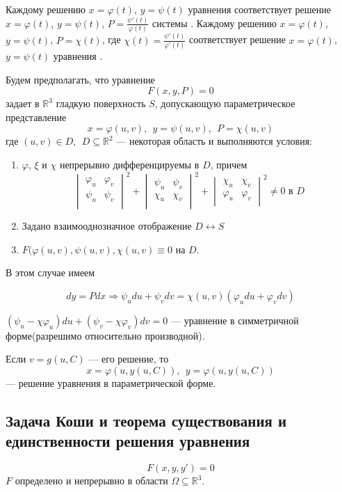   Каждому решению $x = \varphi(t)$, $y = \psi(t)$ уравнения  соответствует решение $x = \varphi(t)$, $y = \psi(t)$, $P = \frac{\psi'(t)}{\varphi(t)}$ системы . Каждому решению $x = \varphi(t)$, $y = \psi(t)$, $P = \chi(t)$, где $\chi(t) = \frac{\psi'(t)}{\varphi'(t)}$ соответствует решение $x = \varphi(t)$, $y = \psi(t)$ уравнения .

  Будем предполагать, что уравнение
  \[ F(x, y, P) = 0 \]
  задает в $\mathbb{R}^3$ гладкую поверхность $S$, допускающую параметрическое представление
  \[ x = \varphi(u, v),~~ y = \psi(u, v),~~ P = \chi(u, v) \]
  где $(u, v) \in D,~~ D \subseteq \mathbb{R}^2$ --- некоторая область и выполняются условия:
  \begin{enumerate}
  \item $\varphi$, $\xi$ и $\chi$ непрерывно дифференцируемы в $D$, причем
  \[ 
  \begin{vmatrix}
  \varphi_u & \varphi_v \\
  \psi_u & \psi_v \\
  \end{vmatrix}^2
  +
  \begin{vmatrix}
  \psi_u & \psi_v \\
  \chi_u & \chi_v \\
  \end{vmatrix}^2
  + 
  \begin{vmatrix}
  \chi_u & \chi_v \\
  \varphi_u & \varphi_v \\
  \end{vmatrix}^2
  \neq 0 \text{ в $D$}\]
  \item Задано взаимооднозначное отображение $D \leftrightarrow S$
  \item $F(\varphi(u, v), \psi(u ,v), \chi(u, v) \equiv 0$ на $D$.
  \end{enumerate}

  В этом случае имеем

  \[ dy = Pdx \Rightarrow \psi_udu + \psi_vdv = \chi(u ,v)(\varphi_udu + \varphi_vdv) \]

  $ (\psi_u - \chi\varphi_u)du + (\psi_v - \chi\varphi_v)dv = 0$ --- уравнение в симметричной форме(разрешимо относительно производной).

  Если $v = g(u, C)$ --- его решение, то
  \[ x = \varphi(u, y(u, C)),~~ y = \varphi(u, y(u, C)) \]
  --- решение уравнения  в параметрической форме.

  \subsection{Задача Коши и теорема существования и единственности решения уравнения }
  \[ F(x, y, y') = 0 \]
  $F$ определено и непрерывно в области $ \Omega \subseteq \mathbb{R}^3$.

